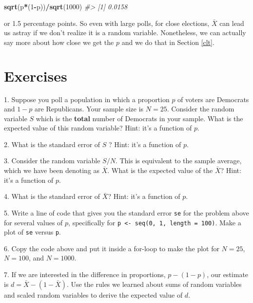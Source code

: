 \documentclass[openany]{book}
\newenvironment{Shaded}{\begin{snugshade}}{\end{snugshade}}
\newcommand{\CommentTok}[1]{\textcolor[rgb]{0.37,0.37,0.37}{\textit{#1}}}
\newcommand{\DecValTok}[1]{\textcolor[rgb]{0.06,0.06,0.06}{#1}}
\newcommand{\KeywordTok}[1]{\textcolor[rgb]{0.27,0.27,0.27}{\textbf{#1}}}
\newcommand{\NormalTok}[1]{#1}
\newcommand{\OperatorTok}[1]{\textcolor[rgb]{0.43,0.43,0.43}{\textbf{#1}}}
\begin{document}
\begin{Shaded}
\begin{Highlighting}[]
\KeywordTok{sqrt}\NormalTok{(p}\OperatorTok{*}\NormalTok{(}\DecValTok{1}\OperatorTok{-}\NormalTok{p))}\OperatorTok{/}\KeywordTok{sqrt}\NormalTok{(}\DecValTok{1000}\NormalTok{)}
\CommentTok{#> [1] 0.0158}
\end{Highlighting}
\end{Shaded}

or 1.5 percentage points. So even with large polls, for close elections, \(\bar{X}\) can lead us astray if we don't realize it is a random variable. Nonetheless, we can actually say more about how close we get the \(p\) and we do that in Section \ref{clt}.

\hypertarget{exercises}{%
\section{Exercises}\label{exercises}}

1. Suppose you poll a population in which a proportion \(p\) of voters are Democrats and \(1-p\) are Republicans. Your sample size is \(N=25\). Consider the random variable \(S\) which is the \textbf{total} number of Democrats in your sample. What is the expected value of this random variable? Hint: it's a function of \(p\).

2. What is the standard error of \(S\) ? Hint: it's a function of \(p\).

3. Consider the random variable \(S/N\). This is equivalent to the sample average, which we have been denoting as \(\bar{X}\). What is the expected value of the \(\bar{X}\)? Hint: it's a function of \(p\).

4. What is the standard error of \(\bar{X}\)? Hint: it's a function of \(p\).

5. Write a line of code that gives you the standard error \texttt{se} for the problem above for several values of \(p\), specifically for \texttt{p\ \textless{}-\ seq(0,\ 1,\ length\ =\ 100)}. Make a plot of \texttt{se} versus \texttt{p}.

6. Copy the code above and put it inside a for-loop to make the plot for \(N=25\), \(N=100\), and \(N=1000\).

7. If we are interested in the difference in proportions, \(p - (1-p)\), our estimate is \(d = \bar{X} - (1-\bar{X})\). Use the rules we learned about sums of random variables and scaled random variables to derive the expected value of \(d\).
\end{document}
